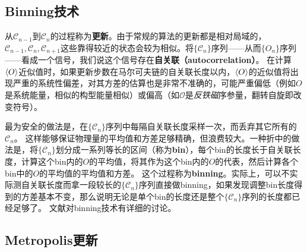 \documentclass[hyperref, UTF8]{ctexart}
\newcommand*{\concept}[1]{{\textbf{#1}}}
\begin{document}
\subsection{Binning技术}

从$\mathcal{C}_{n-1}$到$\mathcal{C}_n$的过程称为\concept{更新}。由于常规的算法的更新都是相对局域的，$\mathcal{C}_{n-1}, \mathcal{C}_n, \mathcal{C}_{n+1}$这些靠得较近的状态会较为相似。将$\{\mathcal{C}_n\}$序列——从而$\{O_n\}$序列——看成一个信号，我们说这个信号存在\concept{自关联（autocorrelation）}。
在计算$\expval{O}$近似值时，如果更新步数在马尔可夫链的自关联长度以内，$\expval{O}$的近似值将出现严重的系统性偏差，对其方差的估算也是非常不准确的，可能严重偏低（例如$O$是系统能量，相似的构型能量相似）或偏高（如$\mathcal{O}$是\emph{反铁磁}序参量，翻转自旋即改变符号）。

最为安全的做法是，在$\{\mathcal{C}_n\}$序列中每隔自关联长度采样一次，而丢弃其它所有的$\mathcal{C}_n$。
这样能够保证物理量的平均值和方差足够精确，但浪费较大。一种折中的做法是，将$\{\mathcal{C}_n\}$划分成一系列等长的区间（称为\concept{bin}），每个bin的长度长于自关联长度，计算这个bin内的$O$的平均值，将其作为这个bin内的$O$的代表，然后计算各个bin中的$O$的平均值的平均值和方差。
这个过程称为\concept{binning}。实际上，可以不实际测自关联长度而拿一段较长的$\{\mathcal{C}_n\}$序列直接做binning，如果发现调整bin长度得到的方差基本不变，那么说明无论是单个bin的长度还是整个$\{\mathcal{C}_n\}$序列的长度都已经足够了。
文献\cite{landau2021guide}对binning技术有详细的讨论。

\subsection{Metropolis更新}
\end{document}
